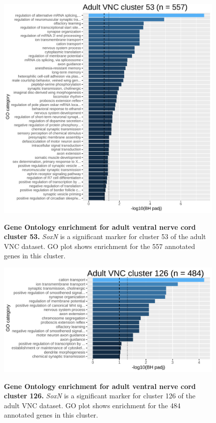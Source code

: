 \documentclass[withindex,glossary]{cam-thesis}
\begin{document}
\setcounter{figure}{23-1}
\begin{figure}[htbp]
\centering
\includegraphics[width=\dimexpr\textwidth\relax,keepaspectratio]{figs/Fig23 allen cluster53.pdf}
\label{fig23}
\caption{\textbf{Gene Ontology enrichment for adult ventral nerve cord cluster 53.} \emph{SoxN} is a significant marker for cluster 53 of the adult VNC dataset. GO plot shows enrichment for the 557 annotated genes in this cluster.}
\end{figure}

\setcounter{figure}{24-1}
\begin{figure}[htbp]
\centering
\includegraphics[width=\dimexpr\textwidth\relax,keepaspectratio]{figs/Fig24 cluster126.pdf}
\label{fig24}
\caption{\textbf{Gene Ontology enrichment for adult ventral nerve cord cluster 126.} \emph{SoxN} is a significant marker for cluster 126 of the adult VNC dataset. GO plot shows enrichment for the 484 annotated genes in this cluster.}
\end{figure}
\end{document}

